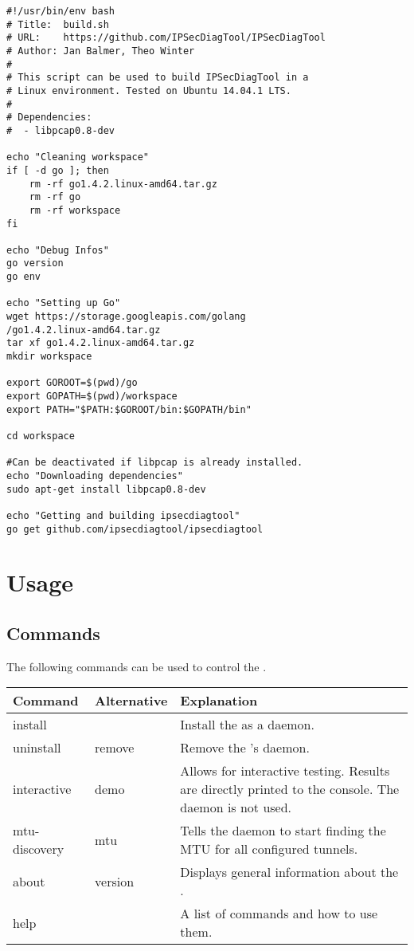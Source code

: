 \lstset{language=bash, breaklines=true}
\begin{lstlisting}
#!/usr/bin/env bash
# Title:  build.sh                                       
# URL:    https://github.com/IPSecDiagTool/IPSecDiagTool
# Author: Jan Balmer, Theo Winter
#    
# This script can be used to build IPSecDiagTool in a
# Linux environment. Tested on Ubuntu 14.04.1 LTS.
#
# Dependencies:
#  - libpcap0.8-dev

echo "Cleaning workspace"
if [ -d go ]; then
	rm -rf go1.4.2.linux-amd64.tar.gz
	rm -rf go
    rm -rf workspace
fi

echo "Debug Infos"
go version
go env

echo "Setting up Go"
wget https://storage.googleapis.com/golang
/go1.4.2.linux-amd64.tar.gz
tar xf go1.4.2.linux-amd64.tar.gz
mkdir workspace

export GOROOT=$(pwd)/go
export GOPATH=$(pwd)/workspace
export PATH="$PATH:$GOROOT/bin:$GOPATH/bin"

cd workspace

#Can be deactivated if libpcap is already installed.
echo "Downloading dependencies"
sudo apt-get install libpcap0.8-dev

echo "Getting and building ipsecdiagtool"
go get github.com/ipsecdiagtool/ipsecdiagtool
\end{lstlisting}


\section{Usage}

\subsection{Commands}
The following commands can be used to control the \entool{}.

\begin{tabularx}{\textwidth}{l|l|>{\raggedright\arraybackslash}X} 
\textbf{Command} & \textbf{Alternative} & \textbf{Explanation} \\
\hline
install &  & Install the \entool{} as a daemon.\\
uninstall & remove & Remove the \entool{}'s daemon.\\
interactive & demo & Allows for interactive testing. Results are directly printed to the console. The daemon is not used. \\
mtu-discovery & mtu & Tells the daemon to start finding the MTU for all configured tunnels. \\
about & version & Displays general information about the \entool{}. \\
help & & A list of commands and how to use them.
\end{tabularx}